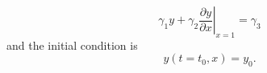 \begin{equation}
{\left. {{\gamma _1}y + {\gamma _2}\frac{{\partial y}}{{\partial x}}} \right|_{x = 1}} = {\gamma _3}
\end{equation}
and the initial condition is
\begin{equation}
y\left( {t = {t_0},x} \right) = {y_0}.
\end{equation}

